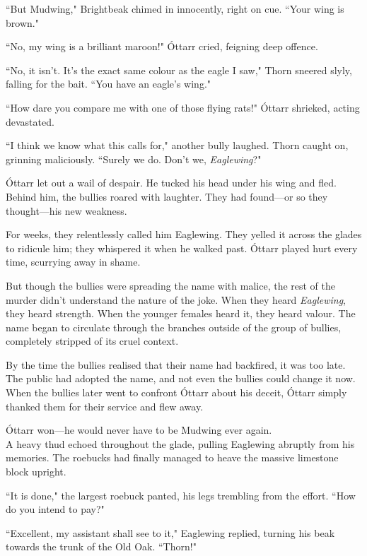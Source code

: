 ``But Mudwing," Brightbeak chimed in innocently, right on cue.
``Your wing is brown."

``No, my wing is a brilliant maroon!" Óttarr cried, feigning deep offence.

``No, it isn't.
It's the exact same colour as the eagle I saw," Thorn sneered slyly, falling for the bait.
``You have an eagle's wing."

``How dare you compare me with one of those flying rats!" Óttarr shrieked, acting devastated.

``I think we know what this calls for," another bully laughed.
Thorn caught on, grinning maliciously.
``Surely we do.
Don't we, \textit{Eaglewing}?"

Óttarr let out a wail of despair.
He tucked his head under his wing and fled.
Behind him, the bullies roared with laughter.
They had found---or so they thought---his new weakness.

For weeks, they relentlessly called him Eaglewing.
They yelled it across the glades to ridicule him; they whispered it when he walked past.
Óttarr played hurt every time, scurrying away in shame.

But though the bullies were spreading the name with malice, the rest of the murder didn't understand the nature of the joke.
When they heard \textit{Eaglewing}, they heard strength.
When the younger females heard it, they heard valour.
The name began to circulate through the branches outside of the group of bullies, completely stripped of its cruel context.


By the time the bullies realised that their name had backfired, it was too late.
The public had adopted the name, and not even the bullies could change it now.
When the bullies later went to confront Óttarr about his deceit, Óttarr simply thanked them for their service and flew away.

Óttarr won---he would never have to be Mudwing ever again.\\

A heavy thud echoed throughout the glade, pulling Eaglewing abruptly from his memories.
The roebucks had finally managed to heave the massive limestone block upright.

``It is done," the largest roebuck panted, his legs trembling from the effort.
``How do you intend to pay?"

``Excellent, my assistant shall see to it," Eaglewing replied, turning his beak towards the trunk of the Old Oak.
``Thorn!"

